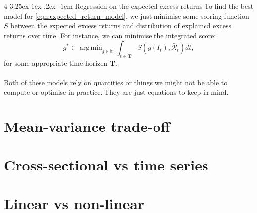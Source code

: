 \documentclass[12pt]{article}
\makeatletter
\renewcommand\paragraph{%
	\@startsection{paragraph}
	{4}
	{\z@}
	{3.25ex \@plus1ex \@minus.2ex}
	{-1em}
	{\normalfont\normalsize\bfseries\maybe@addperiod}%
}
\newcommand{\maybe@addperiod}[1]{%
	#1\@addpunct{.}%
}
\DeclareMathOperator*{\argmin}{arg\,min}
\makeatother
\begin{document}
\paragraph{Regression on the expected excess returns} To find the best model for \eqref{eqn:expected_return_model}, we just minimise some scoring function $S$ between the expected excess returns and distribution of explained excess returns over time. For instance, we can minimise the integrated score:
\begin{equation}
    g^* \in \argmin_{g \in \mathbb{M}} \int_{t \in \mathbf{T}} S(g(I_t), \bar{\mathcal{R}}_t) dt,
\end{equation}
for some appropriate time horizon $\mathbf{T}$.
\\ \\
Both of these models rely on quantities or things we might not be able to compute or optimise in practice. They are just equations to keep in mind. 
\section{Mean-variance trade-off}
\section{Cross-sectional vs time series}
\section{Linear vs non-linear}
\newpage


\end{document}
